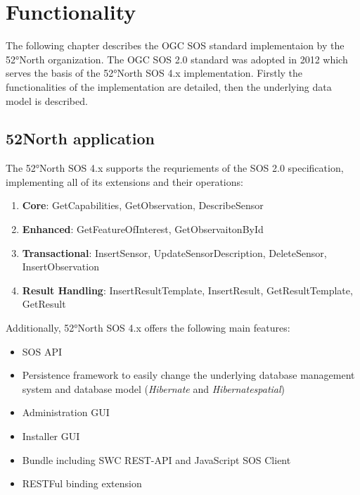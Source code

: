 \chapter{Functionality}\label{H2}
The following chapter describes the OGC SOS standard implementaion by the
52°North organization. The OGC SOS 2.0 standard was adopted in 2012 which
serves the basis of the 52°North SOS 4.x implementation. Firstly the
functionalities of the implementation are detailed, then the underlying data model is described.

\section{52North application}
The 52°North SOS 4.x supports the requriements of the SOS 2.0 specification,
implementing all of its extensions and their operations:
\begin{enumerate}
    \item \textbf{Core}: GetCapabilities, GetObservation, DescribeSensor
    \item \textbf{Enhanced}: GetFeatureOfInterest, GetObservaitonById
    \item \textbf{Transactional}: InsertSensor, UpdateSensorDescription, DeleteSensor,
            InsertObservation
    \item \textbf{Result Handling}: InsertResultTemplate, InsertResult, GetResultTemplate,
            GetResult
\end{enumerate}

Additionally, 52°North SOS 4.x offers the following main features:
\begin{itemize}
    \item SOS API
    \item Persistence framework to easily change the underlying database
    management system and database model (\textit{Hibernate} and
    \textit{Hibernatespatial})
    \item Administration GUI
    \item Installer GUI
    \item Bundle including SWC REST-API and JavaScript SOS Client
    \item RESTFul binding extension
\end{itemize}

